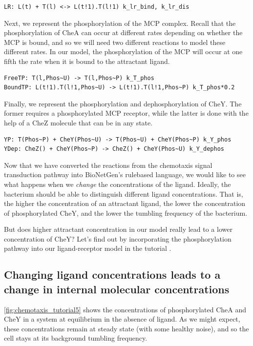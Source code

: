 \begin{verbatim}
LR: L(t) + T(l) <-> L(t!1).T(l!1) k_lr_bind, k_lr_dis
\end{verbatim}

Next, we represent the phosphorylation of the MCP complex. Recall that the phosphorylation of CheA can occur at different rates depending on whether the MCP is bound, and so we will need two different reactions to model these different rates. In our model, the phosphorylation of the MCP will occur at one fifth the rate when it is bound to the attractant ligand.

\begin{verbatim}
FreeTP: T(l,Phos~U) -> T(l,Phos~P) k_T_phos   
BoundTP: L(t!1).T(l!1,Phos~U) -> L(t!1).T(l!1,Phos~P) k_T_phos*0.2
\end{verbatim}

Finally, we represent the phosphorylation and dephosphorylation of CheY. The former requires a phosphorylated MCP receptor, while the latter is done with the help of a CheZ molecule that can be in any state.

\begin{verbatim}
YP: T(Phos~P) + CheY(Phos~U) -> T(Phos~U) + CheY(Phos~P) k_Y_phos
YDep: CheZ() + CheY(Phos~P) -> CheZ() + CheY(Phos~U) k_Y_dephos
\end{verbatim}

Now that we have converted the reactions from the chemotaxis signal transduction pathway into BioNetGen's rule\-based language, we would like to see what happens when we \textit{change} the concentrations of the ligand. Ideally, the bacterium should be able to distinguish different ligand concentrations. That is, the higher the concentration of an attractant ligand, the lower the concentration of phosphorylated CheY, and the lower the tumbling frequency of the bacterium.

But does higher attractant concentration in our model really lead to a lower concentration of CheY? Let's find out by incorporating the phosphorylation pathway into our ligand-receptor model in the tutorial .


\FloatBarrier
{}
\subsection{Changing ligand concentrations leads to a change in internal molecular concentrations}

\autoref{fig:chemotaxis_tutorial5} shows the concentrations of phosphorylated CheA and CheY in a system at equilibrium in the absence of ligand. As we might expect, these concentrations remain at steady state (with some healthy noise), and so the cell stays at its background tumbling frequency.

